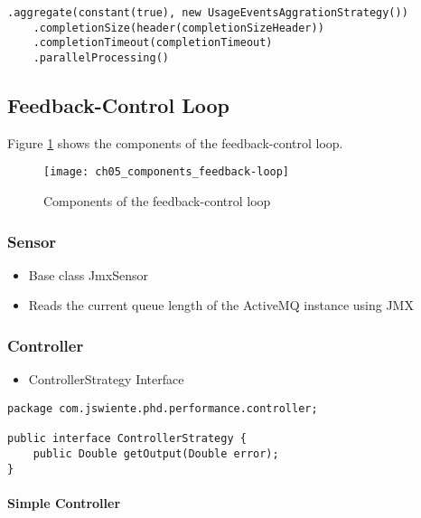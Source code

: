 \begin{lstlisting}[caption={Aggregator configuration in definition of BillingRoute},label=listing:ch5_aggregator_definition]
.aggregate(constant(true), new UsageEventsAggrationStrategy())
	.completionSize(header(completionSizeHeader))
	.completionTimeout(completionTimeout)
	.parallelProcessing()
\end{lstlisting}

\subsection{Feedback-Control Loop}

Figure \ref{fig:ch05_components_feedback_loop} shows the components of the feedback-control loop.

\begin{figure}[htbp]
	\centering
	\texttt{[image: ch05\_components\_feedback-loop]}
	\caption{Components of the feedback-control loop}
	\label{fig:ch05_components_feedback_loop}
\end{figure}

\subsubsection{Sensor}

\begin{itemize}
	\item Base class JmxSensor
	\item Reads the current queue length of the ActiveMQ instance using JMX
\end{itemize}

\subsubsection{Controller}

\begin{itemize}
	\item ControllerStrategy Interface
\end{itemize}

\begin{lstlisting}[caption={ControllerStrategy Interface},label=listing:ch5_controller_strategy]
package com.jswiente.phd.performance.controller;

public interface ControllerStrategy {
	public Double getOutput(Double error);
}
\end{lstlisting}

\paragraph{Simple Controller}\mbox{}\\

